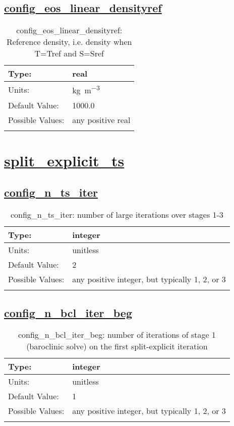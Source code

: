 \subsection[config\_eos\_linear\_densityref]{\hyperref[sec:nm_tab_eos_linear]{config\_eos\_linear\_densityref}}
\label{subsec:nm_sec_config_eos_linear_densityref}
\begin{center}
\begin{longtable}{| p{2.0in} || p{4.0in} |}
    \hline
    Type: & real \\
    \hline
    Units: & \si{kg.m^{-3}} \\
    \hline
    Default Value: & 1000.0 \\
    \hline
    Possible Values: & any positive real \\
    \hline
    \caption{config\_eos\_linear\_densityref: Reference density, i.e. density when T=Tref and S=Sref}
\end{longtable}
\end{center}
\section[split\_explicit\_ts]{\hyperref[sec:nm_tab_split_explicit_ts]{split\_explicit\_ts}}
\label{sec:nm_sec_split_explicit_ts}
\subsection[config\_n\_ts\_iter]{\hyperref[sec:nm_tab_split_explicit_ts]{config\_n\_ts\_iter}}
\label{subsec:nm_sec_config_n_ts_iter}
\begin{center}
\begin{longtable}{| p{2.0in} || p{4.0in} |}
    \hline
    Type: & integer \\
    \hline
    Units: & \si{unitless} \\
    \hline
    Default Value: & 2 \\
    \hline
    Possible Values: & any positive integer, but typically 1, 2, or 3 \\
    \hline
    \caption{config\_n\_ts\_iter: number of large iterations over stages 1-3}
\end{longtable}
\end{center}
\subsection[config\_n\_bcl\_iter\_beg]{\hyperref[sec:nm_tab_split_explicit_ts]{config\_n\_bcl\_iter\_beg}}
\label{subsec:nm_sec_config_n_bcl_iter_beg}
\begin{center}
\begin{longtable}{| p{2.0in} || p{4.0in} |}
    \hline
    Type: & integer \\
    \hline
    Units: & \si{unitless} \\
    \hline
    Default Value: & 1 \\
    \hline
    Possible Values: & any positive integer, but typically 1, 2, or 3 \\
    \hline
    \caption{config\_n\_bcl\_iter\_beg: number of iterations of stage 1 (baroclinic solve) on the first split-explicit iteration}
\end{longtable}
\end{center}
